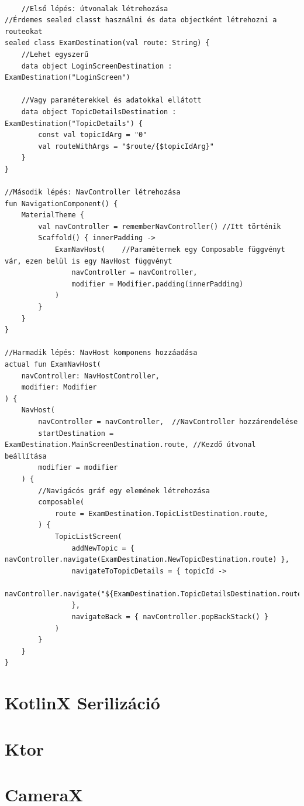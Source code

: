 \begin{lstlisting}

    //Első lépés: útvonalak létrehozása
//Érdemes sealed classt használni és data objectként létrehozni a routeokat
sealed class ExamDestination(val route: String) {
    //Lehet egyszerű
    data object LoginScreenDestination : ExamDestination("LoginScreen")

    //Vagy paraméterekkel és adatokkal ellátott
    data object TopicDetailsDestination : ExamDestination("TopicDetails") {
        const val topicIdArg = "0"
        val routeWithArgs = "$route/{$topicIdArg}"
    }
}

//Második lépés: NavController létrehozása
fun NavigationComponent() {
    MaterialTheme {
        val navController = rememberNavController() //Itt történik
        Scaffold() { innerPadding ->
            ExamNavHost(    //Paraméternek egy Composable függvényt vár, ezen belül is egy NavHost függvényt
                navController = navController,
                modifier = Modifier.padding(innerPadding)
            )
        }
    }
}

//Harmadik lépés: NavHost komponens hozzáadása
actual fun ExamNavHost(
    navController: NavHostController,
    modifier: Modifier
) {
    NavHost(
        navController = navController,  //NavController hozzárendelése
        startDestination = ExamDestination.MainScreenDestination.route, //Kezdő útvonal beállítása
        modifier = modifier
    ) {
        //Navigácós gráf egy elemének létrehozása
        composable(
            route = ExamDestination.TopicListDestination.route,
        ) {
            TopicListScreen(
                addNewTopic = { navController.navigate(ExamDestination.NewTopicDestination.route) },
                navigateToTopicDetails = { topicId ->
                    navController.navigate("${ExamDestination.TopicDetailsDestination.route}/${topicId}")
                },
                navigateBack = { navController.popBackStack() }
            )
        }
    }
}
\end{lstlisting}

\section{KotlinX Serilizáció}

\section{Ktor}

\section{CameraX}


